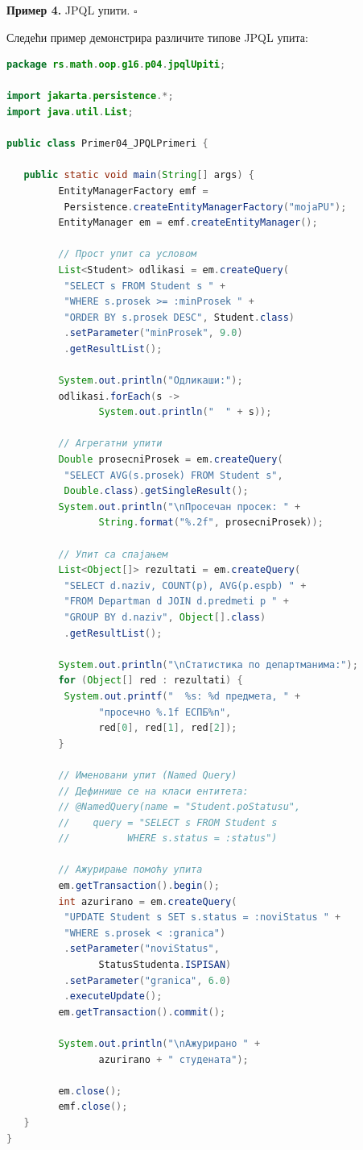 \noindent \textbf{Пример 4.} JPQL упити. $\square$

\medskip

Следећи пример демонстрира различите типове JPQL упита:


\begin{lstlisting}[language=Java]
package rs.math.oop.g16.p04.jpqlUpiti;
 
import jakarta.persistence.*;
import java.util.List;
 
public class Primer04_JPQLPrimeri {
 
   public static void main(String[] args) {
         EntityManagerFactory emf =
          Persistence.createEntityManagerFactory("mojaPU");
         EntityManager em = emf.createEntityManager();
 
         // Прост упит са условом
         List<Student> odlikasi = em.createQuery(
          "SELECT s FROM Student s " +
          "WHERE s.prosek >= :minProsek " +
          "ORDER BY s.prosek DESC", Student.class)
          .setParameter("minProsek", 9.0)
          .getResultList();
 
         System.out.println("Одликаши:");
         odlikasi.forEach(s ->
                System.out.println("  " + s));
 
         // Агрегатни упити
         Double prosecniProsek = em.createQuery(
          "SELECT AVG(s.prosek) FROM Student s",
          Double.class).getSingleResult();
         System.out.println("\nПросечан просек: " +
                String.format("%.2f", prosecniProsek));
 
         // Упит са спајањем
         List<Object[]> rezultati = em.createQuery(
          "SELECT d.naziv, COUNT(p), AVG(p.espb) " +
          "FROM Departman d JOIN d.predmeti p " +
          "GROUP BY d.naziv", Object[].class)
          .getResultList();
 
         System.out.println("\nСтатистика по департманима:");
         for (Object[] red : rezultati) {
          System.out.printf("  %s: %d предмета, " +
                "просечно %.1f ЕСПБ%n",
                red[0], red[1], red[2]);
         }
 
         // Именовани упит (Named Query)
         // Дефинише се на класи ентитета:
         // @NamedQuery(name = "Student.poStatusu",
         //    query = "SELECT s FROM Student s
         //          WHERE s.status = :status")
 
         // Ажурирање помоћу упита
         em.getTransaction().begin();
         int azurirano = em.createQuery(
          "UPDATE Student s SET s.status = :noviStatus " +
          "WHERE s.prosek < :granica")
          .setParameter("noviStatus",
                StatusStudenta.ISPISAN)
          .setParameter("granica", 6.0)
          .executeUpdate();
         em.getTransaction().commit();
 
         System.out.println("\nАжурирано " +
                azurirano + " студената");
 
         em.close();
         emf.close();
   }
}
\end{lstlisting}



